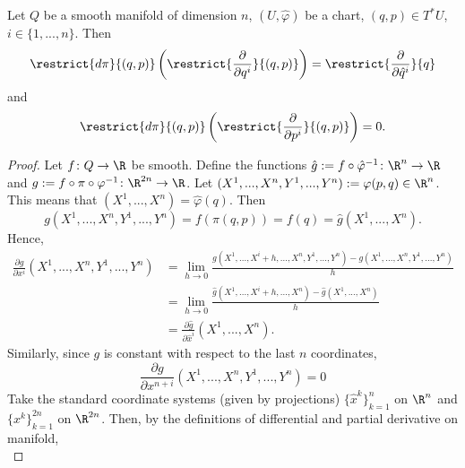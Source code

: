 \begin{proposition}
  Let
    $Q$ be a smooth manifold of dimension $n$,
    $(U, \hat{\varphi})$ be a chart,
    $(q, p) \in T^* U$,
    $ i \in \{1, ..., n\}$.
  Then
  \begin{equation}
    \restrict{d \pi}{(q, p)}
    \left(\restrict{\frac{\partial}{\partial q^i}}{(q, p)}\right)
    = \restrict{\frac{\partial}{\partial \hat{q}^i}}{q}
  \end{equation}
  and
  \begin{equation}
    \restrict{d \pi}{(q, p)}
    \left(\restrict{\frac{\partial}{\partial p^i}}{(q, p)}\right)
    = 0.
  \end{equation}
\end{proposition}
\begin{proof}
  Let $f \colon Q \to \R$ be smooth.
  Define the functions
  $\hat{g} := f \circ \hat{\varphi}^{-1} \colon \R^n \to \R$ and
  $g := f \circ \pi \circ \varphi^{-1} \colon \R^{2 n} \to \R$.
  Let $(X^1, ..., X^n, Y^1, ..., Y^n) := \varphi(p, q) \in \R^n$.
  This means that $(X^1, ..., X^n) = \hat{\varphi}(q)$.
  Then
  \begin{equation}
    g(X^1, ..., X^n, Y^1, ..., Y^n)
    = f(\pi(q, p))
    = f(q)
    = \hat{g}(X^1, ..., X^n).
  \end{equation}
  Hence,
  \begin{equation}
    \begin{split}
      \frac{\partial g}{\partial x^i}(X^1, ..., X^n, Y^1, ..., Y^n)
      & = \lim_{h \to 0}
        \frac
        {g(X^1, ..., X^i + h, ..., X^n, Y^1, ..., Y^n)
         - g(X^1, ..., X^n, Y^1, ..., Y^n)}
        {h} \\
      & = \lim_{h \to 0}
        \frac{\hat{g}(X^1, ..., X^i + h, ..., X^n) - \hat{g}(X^1, ..., X^n)}{h}
        \\
      & = \frac{\partial \hat{g}}{\partial \hat{x}^i}(X^1, ..., X^n).
    \end{split}
  \end{equation}
  Similarly, since $g$ is constant with respect to the last $n$ coordinates,
  \begin{equation}
    \frac{\partial g}{\partial x^{n + i}}(X^1, ..., X^n, Y^1, ..., Y^n) = 0
  \end{equation}
  Take the standard coordinate systems (given by projections)
  $\{\hat{x}^k\}_{k = 1}^n$ on $\R^n$ and
  $\{x^k\}_{k = 1}^{2 n}$ on $\R^{2 n}$.
  Then, by the definitions of differential and partial derivative on manifold,
  \begin{equation}

\end{equation}
\end{proof}
